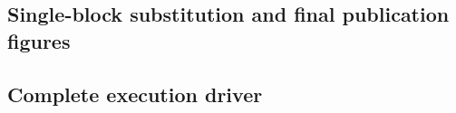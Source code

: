 \documentclass[12pt,reqno]{amsart}
\numberwithin{equation}{section}
\theoremstyle{plain}
\theoremstyle{definition}
\theoremstyle{remark}
\begin{document}


\Needspace{0.28\textheight}
\subsection{Single-block substitution and final publication figures}\mbox{}\par\smallskip





\Needspace{0.28\textheight}
\subsection{Complete execution driver}\mbox{}\par\smallskip


\end{document}
